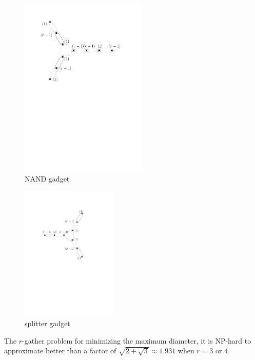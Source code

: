 \begin{figure}[htbp]
\begin{center}
\includegraphics[width=2.4in]{figs/nandgadget}
\caption{NAND gadget}
\label{fig:nandgadget}
\end{center}
\end{figure}

\begin{figure}[htbp]
\begin{center}
\includegraphics[width=1.8in]{figs/splittergadget}
\caption{splitter gadget}
\label{fig:splittercircuit}
\end{center}
\end{figure}

\begin{theorem}
The $r$-gather problem for minimizing the maximum diameter, it is NP-hard to approximate better than a factor of $\sqrt{2+\sqrt{3}} \approx 1.931$ when $r=3$ or $4$.
\end{theorem}



